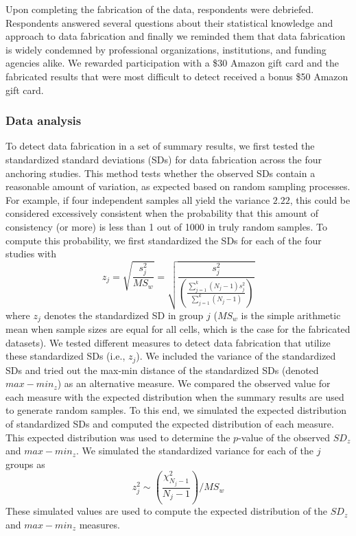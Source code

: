 \documentclass{article}
\begin{document}
Upon completing the fabrication of the data, respondents were debriefed. Respondents answered several questions about their statistical knowledge and approach to data fabrication and finally we reminded them that data fabrication is widely condemned by professional organizations, institutions, and funding agencies alike. We rewarded participation with a \$30 Amazon gift card and the fabricated results that were most difficult to detect received a bonus \$50 Amazon gift card.

\subsubsection*{Data analysis}

To detect data fabrication in a set of summary results, we first tested the standardized standard deviations (SDs) for data fabrication \citep{simonsohn2013} across the four anchoring studies. This method tests whether the observed SDs contain a reasonable amount of variation, as expected based on random sampling processes. For example, if four independent samples all yield the variance $2.22$, this could be considered excessively consistent when the probability that this amount of consistency (or more) is less than 1 out of 1000 in truly random samples. To compute this probability, we first standardized the SDs for each of the four studies with
\begin{equation}
z_j=\sqrt{\frac{s^2_j}{MS_w}}=\sqrt{\frac{s^2_j}{\left(\frac{\sum\limits^k_{j=1}(N_j-1)s^2_j}{\sum\limits^k_{j=1}(N_j-1)}\right)}}
\label{s2_j}
\end{equation}
where $z_j$ denotes the standardized SD in group $j$ ($MS_w$ is the simple arithmetic mean when sample sizes are equal for all cells, which is the case for the fabricated datasets). We tested different measures to detect data fabrication that utilize these standardized SDs (i.e., $z_j$). We included the variance of the standardized SDs \citep[i.e.,  $SD_{z}$;][]{simonsohn2013} and tried out the max-min distance of the standardized SDs (denoted $max-min_{z}$) as an alternative measure. We compared the observed value for each measure with the expected distribution when the summary results are used to generate random samples. To this end, we simulated the expected distribution of standardized SDs and computed the expected distribution of each measure. This expected distribution was used to determine the $p$-value of the observed $SD_z$ and $max-min_z$. We simulated the standardized variance for each of the $j$ groups as
\begin{equation}
z^2_j\sim\left(\frac{\chi^2_{N_j-1}}{N_j-1}\right)/MS_w
\label{simvar}
\end{equation}
These simulated values are used to compute the expected distribution of the $SD_z$ and $max-min_z$  measures.
\end{document}
